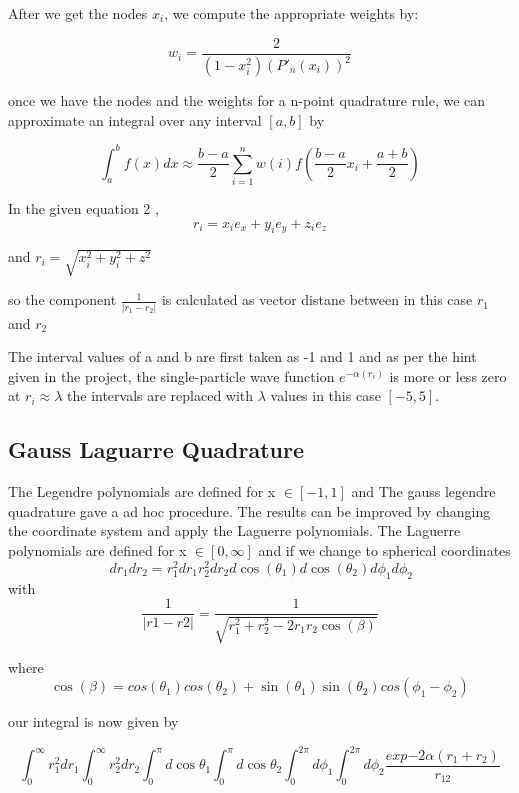 \documentclass[9pt,a4paper,titlepage]{article}
\begin{document}
After we get the nodes $ x_{i}$, we compute the appropriate weights by:

$$w_i=\frac{2}{(1-x_i^2)(P'_n(x_i))^2}$$


once we have the nodes and the weights for a n-point quadrature rule, we can approximate an integral over any interval ${\displaystyle [a,b]} $ by

\begin{equation}
\int_{a}^{b} f(x)dx\approx \frac{b-a}{2}\sum_{i=1}^{n}w(i)f( \frac{b-a}{2}x_i + \frac{a+b}{2})
\end{equation}

In the given equation  2 ,  
$$r_i=x_ie_x+y_ie_y+z_ie_z$$

and $r_i=\sqrt{x_i^2+y_i^2+z^2} $

so the component $\frac{1}{|{r_1-r_2}|}$ is calculated as vector distane between in this case $r_1$ and $r_2$


The interval values of a and b are first taken as -1 and 1 and as per the  hint given in the project, the single-particle wave function
$e^{-\alpha (r_i)}$
is more or less zero at $r_i \approx\lambda$
the intervals are replaced with $\lambda$ values in this case $[-5,5]$.

\subsection{Gauss Laguarre Quadrature }

The Legendre polynomials \cite{book2} \cite{book3} are defined for x $\in [-1,1]$ and The gauss legendre quadrature  gave a ad hoc procedure. The results can be improved by changing the coordinate system and apply the Laguerre polynomials. The Laguerre polynomials are defined for x $\in [0,\infty]$ and if we change to spherical
coordinates
\begin{equation}
\,dr_1dr_2=r_1^2dr_1 r_2^2dr_2 d \cos(\theta_1) d\cos(\theta_2)d\phi_1d\phi_2
\end{equation}
with 
\begin{equation}
\frac{1}{|{r1-r2}|}= \frac{1}{\sqrt{r_1^2+r_2^2-2r_1r_2\cos(\beta)}}
\end{equation}

where
\begin{equation}
\cos(\beta)=cos(\theta_1)cos(\theta_2)+\sin(\theta_1)\sin(\theta_2)cos(\phi_1-\phi_2)
\end{equation}

our integral is now given by 

\begin{equation}
\int_{0}^{\infty} r_1^2dr_1\int_{0}^{\infty} r_2^2dr_2\int_{0}^{\pi}d\cos{\theta_1}\int_{0}^{\pi}d\cos{\theta_2}\int_{0}^{2\pi} d\phi_1\int_{0}^{2\pi} d\phi_2\frac{exp{-2\alpha({r_1+r_2})}}{r_{12}}
\end{equation}
\end{document}
